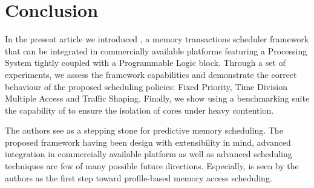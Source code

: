 \section{Conclusion}
    
    In the present article we introduced \schim, a memory transactions scheduler framework that can be integrated in commercially available platforms featuring a Processing System tightly coupled with a Programmable Logic block. Through a set of experiments, we assess the framework capabilities and demonstrate the correct behaviour of the proposed scheduling policies: Fixed Priority, Time Division Multiple Access and Traffic Shaping. Finally, we show using a benchmarking suite the capability of \schim to ensure the isolation of cores under heavy contention.
    
    The authors see \schim as a stepping stone for predictive memory scheduling. The proposed framework having been design with extensibility in mind, advanced integration in commercially available platform as well as advanced scheduling techniques are few of many possible future directions. Especially, \schim is seen by the authors as the first step toward profile-based memory access scheduling.
